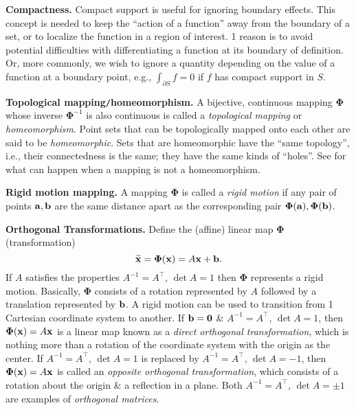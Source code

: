 \documentclass{article}
\begin{document}
\begin{enumerate}
	{\bf Compactness.} Compact support is useful for ignoring boundary effects. This concept is needed to keep the ``action of a function'' away from the boundary of a set, or to localize the function in a region of interest. 1 reason is to avoid potential difficulties with differentiating a function at its boundary of definition. Or, more commonly, we wish to ignore a quantity depending on the value of a function at a boundary point, e.g., $\int_{\partial S} f = 0$ if $f$ has compact support in $S$.
	
	{\bf Topological mapping{\tt/}homeomorphism.} A bijective, continuous mapping $\boldsymbol{\Phi}$ whose inverse $\boldsymbol{\Phi}^{-1}$ is also continuous is called a {\it topological mapping} or {\it homeomorphism}. Point sets that can be topologically mapped onto each other are said to be {\it homeomorphic}. Sets that are homeomorphic have the ``same topology'', i.e., their connectedness is the same; they have the same kinds of ``holes''. See \cite[Sect. 2.3.1]{Walker2015} for what can happen when a mapping is not a homeomorphism.
	
	{\bf Rigid motion mapping.} A mapping $\boldsymbol{\Phi}$ is called a {\it rigid motion} if any pair of points ${\bf a},{\bf b}$ are the same distance apart as the corresponding pair $\boldsymbol{\Phi}({\bf a}),\boldsymbol{\Phi}({\bf b})$.
	
	{\bf Orthogonal Transformations.} Define the (affine) linear map $\boldsymbol{\Phi}$ (transformation)
	\begin{equation}
		\label{transformation}
		\widetilde{\bf x} = \boldsymbol{\Phi}({\bf x}) = A{\bf x} + {\bf b}.
	\end{equation}
	If $A$ satisfies the properties $A^{-1} = A^\top$, $\det A = 1$ then $\boldsymbol{\Phi}$ represents a rigid motion. Basically, $\boldsymbol{\Phi}$ consists of a rotation represented by $A$ followed by a translation represented by ${\bf b}$. A rigid motion can be used to transition from 1 Cartesian coordinate system to another. If ${\bf b} = {\bf 0}$ \& $A^{-1} = A^\top$, $\det A = 1$, then $\boldsymbol{\Phi}({\bf x}) = A{\bf x}$ is a linear map known as a {\it direct orthogonal transformation}, which is nothing more than a rotation of the coordinate system with the origin as the center. If $A^{-1} = A^\top$, $\det A = 1$ is replaced by $A^{-1} = A^\top$, $\det A = -1$, then $\boldsymbol{\Phi}({\bf x}) = A{\bf x}$ is called an {\it opposite orthogonal transformation}, which consists of a rotation about the origin \& a reflection in a plane. Both $A^{-1} = A^\top$, $\det A = \pm1$ are examples of {\it orthogonal matrices}.
	

\end{enumerate}
\end{document}
